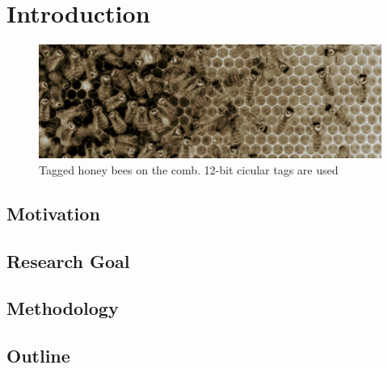 \chapter{Introduction}
\label{ch:intro}

\begin{figure}[htb]
	\centering
	\includegraphics[width=1.0\textwidth]{Figures/markers}
	\caption{Tagged honey bees on the comb. 12-bit cicular tags are used}
	\label{fig:markers}
\end{figure}

\section{Motivation}

\section{Research Goal}

\section{Methodology}

\section{Outline}